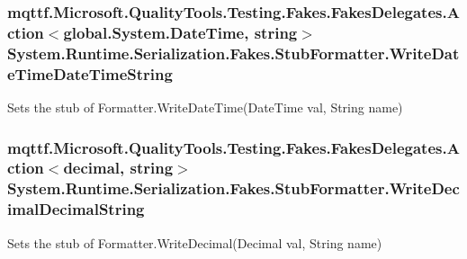 \hypertarget{class_system_1_1_runtime_1_1_serialization_1_1_fakes_1_1_stub_formatter_a3240f920d67253cbee7a67582bafc9b9}{
\subsubsection[{Write\-Date\-Time\-Date\-Time\-String}]{\setlength{\rightskip}{0pt plus 5cm}mqttf.\-Microsoft.\-Quality\-Tools.\-Testing.\-Fakes.\-Fakes\-Delegates.\-Action$<$global.\-System.\-Date\-Time, string$>$ System.\-Runtime.\-Serialization.\-Fakes.\-Stub\-Formatter.\-Write\-Date\-Time\-Date\-Time\-String}}\label{class_system_1_1_runtime_1_1_serialization_1_1_fakes_1_1_stub_formatter_a3240f920d67253cbee7a67582bafc9b9}


Sets the stub of Formatter.\-Write\-Date\-Time(\-Date\-Time val, String name)

\hypertarget{class_system_1_1_runtime_1_1_serialization_1_1_fakes_1_1_stub_formatter_a680e6810590f089ed7332142cf39ee36}{
\subsubsection[{Write\-Decimal\-Decimal\-String}]{\setlength{\rightskip}{0pt plus 5cm}mqttf.\-Microsoft.\-Quality\-Tools.\-Testing.\-Fakes.\-Fakes\-Delegates.\-Action$<$decimal, string$>$ System.\-Runtime.\-Serialization.\-Fakes.\-Stub\-Formatter.\-Write\-Decimal\-Decimal\-String}}\label{class_system_1_1_runtime_1_1_serialization_1_1_fakes_1_1_stub_formatter_a680e6810590f089ed7332142cf39ee36}


Sets the stub of Formatter.\-Write\-Decimal(\-Decimal val, String name)

